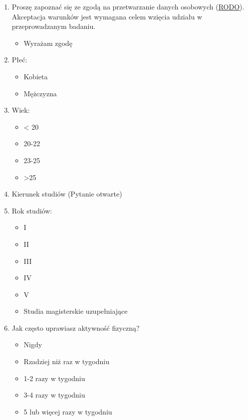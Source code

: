 \documentclass[a4paper, 12pt, oneside]{article}
\begin{document}
\begin{enumerate}
    \item Proszę zapoznać się ze zgodą na przetwarzanie danych osobowych (\href{https://docs.google.com/document/d/1VQv2_CO1SqlR_pXiEmVHBt2ydAM3dw9R/edit}{RODO}). Akceptacja warunków jest wymagana celem wzięcia udziału w przeprowadzanym badaniu.
    \begin{itemize}
        \item Wyrażam zgodę
    \end{itemize}

    \item Płeć:
    \begin{itemize}
        \item Kobieta
        \item Mężczyzna
    \end{itemize}

    \item Wiek:
    \begin{itemize}
        \item < 20
        \item 20-22
        \item 23-25
        \item >25
    \end{itemize}

    \item Kierunek studiów (Pytanie otwarte)

    \item Rok studiów:
    \begin{itemize}
        \item I
        \item II
        \item III
        \item IV
        \item V
        \item Studia magisterskie uzupełniające
    \end{itemize}

    \item Jak często uprawiasz aktywność fizyczną?
    \begin{itemize}
        \item Nigdy
        \item Rzadziej niż raz w tygodniu
        \item 1-2 razy w tygodniu
        \item 3-4 razy w tygodniu
        \item 5 lub więcej razy w tygodniu
    \end{itemize}


\end{enumerate}
\end{document}
